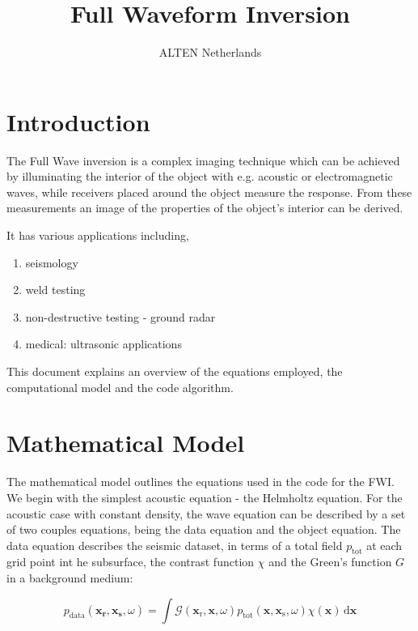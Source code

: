 \documentclass[10pt,a4paper]{article}
\title{Full Waveform Inversion}
\author{ALTEN Netherlands}
\newcommand{\df}[1]{\, \ensuremath{\mbox{d}#1}}
\newcommand{\xs}{\mathbf{x}_\text{s}}
\newcommand{\xr}{\mathbf{x}_\text{r}}
\newcommand{\x}{\mathbf{x}}
\begin{document}
\maketitle
\section{Introduction}

The Full Wave inversion is a complex imaging technique which can be achieved by illuminating the interior of the object with e.g. acoustic or electromagnetic waves, while receivers placed around the object measure the response. From these measurements an image of the properties of the object's interior can be derived.

It has various applications including,
 
\begin{enumerate}
    \item seismology
    \item weld testing
    \item non-destructive testing - ground radar
    \item medical: ultrasonic applications
\end{enumerate}

This document explains an overview of the equations employed, the computational model and the code algorithm.

\section{Mathematical Model}

The mathematical model outlines the equations used in the code for the FWI. We begin with the simplest acoustic equation - the Helmholtz equation. 
For the acoustic case with constant density, the wave equation can be described by a set of two couples equations, being the data equation and the object equation. The data equation describes the seismic dataset, in terms of a total field $p_{\text{tot}}$ at each grid point int he subsurface, the contrast function $\chi$ and the Green's function $G$ in a background medium:

\begin{equation} \label{eq:dataequation}
p_\text{data}(\mathbf{x_\text{r}},\mathbf{x_\text{s}},\omega) = \int \mathcal{G}(\xr, \x, \omega) p_\text{tot}(\x, \xs, \omega) \chi(\x) \df{\x} \end{equation}
\end{document}
